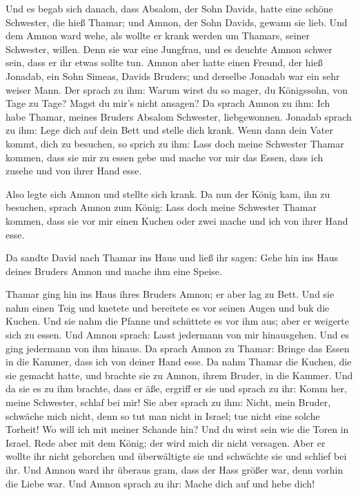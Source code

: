  Und es begab sich danach, dass Absalom, der Sohn Davids,
hatte eine schöne Schwester, die hieß Thamar; und Amnon, der Sohn
Davids, gewann sie lieb.  Und dem Amnon ward wehe, als
wollte er krank werden um Thamars, seiner Schwester, willen. Denn sie
war eine Jungfrau, und es deuchte Amnon schwer sein, dass er ihr etwas
sollte tun.  Amnon aber hatte einen Freund, der hieß
Jonadab, ein Sohn Simeas, Davids Bruders; und derselbe Jonadab war ein
sehr weiser Mann.  Der sprach zu ihm: Warum wirst du so
mager, du Königssohn, von Tage zu Tage? Magst du mir's nicht ansagen? Da
sprach Amnon zu ihm: Ich habe Thamar, meines Bruders Absalom Schwester,
liebgewonnen.  Jonadab sprach zu ihm: Lege dich auf dein
Bett und stelle dich krank. Wenn dann dein Vater kommt, dich zu
besuchen, so sprich zu ihm: Lass doch meine Schwester Thamar kommen,
dass sie mir zu essen gebe und mache vor mir das Essen, dass ich zusehe
und von ihrer Hand esse.

 Also legte sich Amnon und stellte sich krank. Da nun der
König kam, ihn zu besuchen, sprach Amnon zum König: Lass doch meine
Schwester Thamar kommen, dass sie vor mir einen Kuchen oder zwei mache
und ich von ihrer Hand esse.

 Da sandte David nach Thamar ins Haus und ließ ihr sagen:
Gehe hin ins Haus deines Bruders Amnon und mache ihm eine Speise.

 Thamar ging hin ins Haus ihres Bruders Amnon; er aber lag
zu Bett. Und sie nahm einen Teig und knetete und bereitete es vor seinen
Augen und buk die Kuchen.  Und sie nahm die Pfanne und
schüttete es vor ihm aus; aber er weigerte sich zu essen. Und Amnon
sprach: Lasst jedermann von mir hinausgehen. Und es ging jedermann von
ihm hinaus.  Da sprach Amnon zu Thamar: Bringe das Essen
in die Kammer, dass ich von deiner Hand esse. Da nahm Thamar die Kuchen,
die sie gemacht hatte, und brachte sie zu Amnon, ihrem Bruder, in die
Kammer.  Und da sie es zu ihm brachte, dass er äße,
ergriff er sie und sprach zu ihr: Komm her, meine Schwester, schlaf bei
mir!  Sie aber sprach zu ihm: Nicht, mein Bruder,
schwäche mich nicht, denn so tut man nicht in Israel; tue nicht eine
solche Torheit!  Wo will ich mit meiner Schande hin? Und
du wirst sein wie die Toren in Israel. Rede aber mit dem König; der wird
mich dir nicht versagen.  Aber er wollte ihr nicht
gehorchen und überwältigte sie und schwächte sie und schlief bei ihr.
 Und Amnon ward ihr überaus gram, dass der Hass größer
war, denn vorhin die Liebe war. Und Amnon sprach zu ihr: Mache dich auf
und hebe dich!

